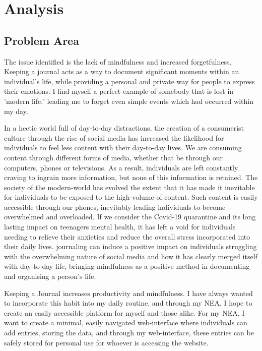 \chapter{Analysis}


\section{Problem Area}

The issue identified is the lack of mindfulness and increased forgetfulness. Keeping a journal acts as a way to document significant moments within an individual's life, while providing a personal and private way for people to express their emotions. I find myself a perfect example of somebody that is lost in 'modern life,' leading me to forget even simple events which had occurred within my day. 

In a hectic world full of day-to-day distractions, the creation of a consumerist culture through the rise of social media has increased the likelihood for individuals to feel less content with their day-to-day lives. We are  consuming content through different forms of media, whether that be through our computers, phones or televisions. As a result, individuals are left constantly craving to ingrain more information, but none of this information is retained. The society of the modern-world has evolved the extent that it has made it inevitable for individuals to be exposed to the high-volume of content. Such content is easily accessible through our phones,  inevitably leading individuals to become overwhelmed and overloaded. If we consider the Covid-19 quarantine and its long lasting impact on teenagers mental health, \cite{Imran_Aamer_Sharif_Bodla_Naveed_2020} it has left a void for individuals needing to relieve their anxieties and reduce the overall stress incorporated into their daily lives. journaling can induce a positive impact on individuals struggling with the overwhelming nature of social media and how it has clearly merged itself with day-to-day life, bringing mindfulness as a positive method in documenting and organising a person's life. 


Keeping a Journal increases productivity and mindfulness. I have always wanted to incorporate this habit into my daily routine, and through my NEA, I hope to create an easily accessible platform for myself and those alike. For my NEA, I want to create a minimal, easily navigated web-interface where individuals can add entries, storing the data, and through my web-interface, these entries can be safely stored for personal use for whoever is accessing the website. 

